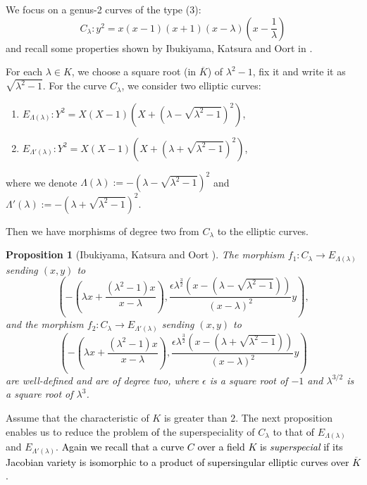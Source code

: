 \documentclass[a4paper, 11pt]{article}
\theoremstyle{plain}
\newtheorem{prop}[defn]{Proposition}
\newcommand{\?}{\textcolor{red}{??}}
\newcommand{\lm}{\lambda}
\newcommand{\Lm}{\Lambda}
\begin{document}
We focus on a genus-2 curves of the type (3):
\[
C_{\lm}:y^2=x(x-1)(x+1)(x-{\lambda}) \left(x-\frac{1}{\lambda}\right)
\]
 and recall some properties shown by Ibukiyama, Katsura and Oort in \cite{IKO02}.

For each $\lambda \in K$, we choose a square root (in $\overline K$) of $\lambda^2-1$, fix it and write it as $\sqrt{\lambda^2-1}$.
For the curve $C_{\lm}$, we consider two elliptic curves:

\begin{enumerate}


\item[] $E_{\Lambda(\lm)}: Y^2=X(X-1)(X+(\lambda-\sqrt{{\lm}^2-1})^2)$,

\item[] $E_{{\Lambda}'(\lm)}: Y^2=X(X-1)(X+(\lambda+\sqrt{{\lm}^2-1})^2)$,
\end{enumerate}
where we denote $\Lm(\lm):=-(\lambda-\sqrt{{\lm}^2-1})^2$ and ${\Lm}'(\lm):=-(\lambda+\sqrt{{\lm}^2-1})^2$. 


  Then we have morphisms of degree two from $C_{\lm}$ to the elliptic curves.

   \begin{prop}[Ibukiyama, Katsura and Oort {\cite[\S 1.2]{IKO02}}]
    \label{propmapctoe}
    The morphism $ f_1: C_{\lm} \longrightarrow E_{\Lm(\lm)}$ sending $(x,y)$ to 
    \[
    \left(- \left(\lambda x +\frac{({\lambda}^2-1)x}{x-\lambda} \right), \frac{\epsilon {\lambda}^{\frac{3}{2}}(x-(\lambda-\sqrt{{\lm}^2-1}))}{(x-\lambda)^2} y\right),
    \]
    and the morphism $f_2: C_{\lm} \longrightarrow E_{{\Lm}'(\lm)}$ sending $(x,y)$ to 
    \[
    \left( - \left(\lambda x +\frac{({\lambda}^2-1)x}{x-\lambda} \right), \frac{\epsilon {\lambda}^{\frac{3}{2}}(x-(\lambda+\sqrt{{\lm}^2-1}))}{(x-\lambda)^2} y\right)
    \]
  are well-defined and are of degree two,
    where $\epsilon$ is a square root of $-1$
    and  ${\lm}^{3/2}$ is a square root of $\lm^3$.
    
\end{prop}

Assume that the characteristic of $K$ is greater than $2$.
The next proposition enables us to reduce the problem \textcolor{black}{of} the superspeciality of $C_\lm$ to that \textcolor{black}{of} $E_{\Lambda(\lm)}$ and $ E_{{\Lambda}'(\lm)}$.
\textcolor{black}{Again we recall that a curve $C$ over a field $K$ is \textit{superspecial} if its Jacobian variety is isomorphic to a product of supersingular elliptic curves over $\overline{K}$.}
   
\end{document}
